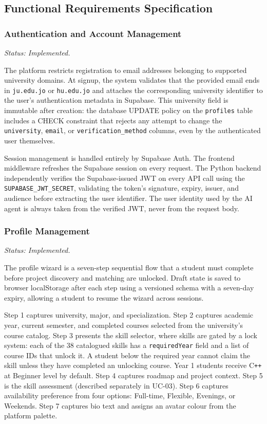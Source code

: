 \documentclass[12pt,a4paper]{article}
\begin{document}
\subsection{Functional Requirements Specification}

\subsubsection{Authentication and Account Management}

\textit{Status: Implemented.}

The platform restricts registration to email addresses belonging to supported university
domains. At signup, the system validates that the provided email ends in \texttt{ju.edu.jo}
or \texttt{hu.edu.jo} and attaches the corresponding university identifier to the user's
authentication metadata in Supabase. This university field is immutable after creation:
the database UPDATE policy on the \texttt{profiles} table includes a CHECK constraint that
rejects any attempt to change the \texttt{university}, \texttt{email}, or
\texttt{verification\_method} columns, even by the authenticated user themselves.

Session management is handled entirely by Supabase Auth. The frontend middleware refreshes
the Supabase session on every request. The Python backend independently verifies the
Supabase-issued JWT on every API call using the \texttt{SUPABASE\_JWT\_SECRET}, validating
the token's signature, expiry, issuer, and audience before extracting the user identifier.
The user identity used by the AI agent is always taken from the verified JWT, never from
the request body.

\subsubsection{Profile Management}

\textit{Status: Implemented.}

The profile wizard is a seven-step sequential flow that a student must complete before
project discovery and matching are unlocked. Draft state is saved to browser localStorage
after each step using a versioned schema with a seven-day expiry, allowing a student to
resume the wizard across sessions.

Step 1 captures university, major, and specialization. Step 2 captures academic year,
current semester, and completed courses selected from the university's course catalog.
Step 3 presents the skill selector, where skills are gated by a lock system: each of
the 38 catalogued skills has a \texttt{requiredYear} field and a list of course IDs that
unlock it. A student below the required year cannot claim the skill unless they have
completed an unlocking course. Year 1 students receive C\texttt{++} at Beginner level by
default. Step 4 captures roadmap and project context. Step 5 is the skill assessment
(described separately in UC-03). Step 6 captures availability preference from four
options: Full-time, Flexible, Evenings, or Weekends. Step 7 captures bio text and assigns
an avatar colour from the platform palette.
\end{document}

